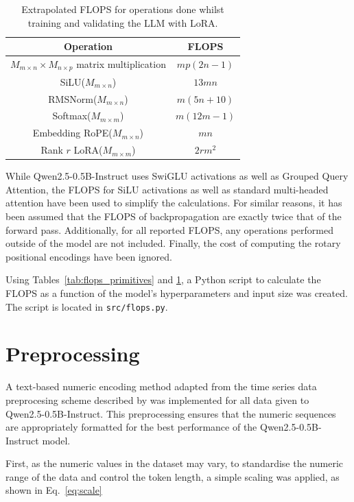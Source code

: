 \documentclass[11pt,a4paper]{article}
\begin{document}
\begin{table}
    \centering
    \begin{tabular}{c|c}
        Operation & FLOPS \\
        \hline
        $M_{m \times n} \times M_{n \times p}$ matrix multiplication & $mp(2n-1)$\\
        SiLU($M_{m \times n}$)& $13mn$ \\
        RMSNorm($M_{m \times n}$) & $m(5n + 10)$ \\
        Softmax($M_{m \times m}$) & $m(12m-1)$\\
        Embedding RoPE($M_{m \times n}$) & $mn$ \\ 
        Rank $r$ LoRA($M_{m \times m}$) & $2rm^2$
    \end{tabular}
    \caption{Extrapolated FLOPS for operations done whilst training and validating the LLM with LoRA.}
    \label{tab:flops_advanced}
\end{table}
While Qwen2.5-0.5B-Instruct uses SwiGLU activations as well as Grouped Query Attention, the FLOPS for SiLU activations as well as standard multi-headed attention have been used to simplify the calculations. For similar reasons, it has been assumed that the FLOPS of backpropagation are exactly twice that of the forward pass. Additionally, for all reported FLOPS, any operations performed outside of the model are not included. Finally, the cost of computing the rotary positional encodings have been ignored.

Using Tables~\ref{tab:flops_primitives} and \ref{tab:flops_advanced}, a Python script to calculate the FLOPS as a function of the model's hyperparameters and input size was created. The script is located in \texttt{src/flops.py}.

\section{Preprocessing}
\label{zero}
A text-based numeric encoding method adapted from the time series data preprocesing scheme described by \citeauthor{gruver2024largelanguagemodelszeroshot} was implemented for all data given to Qwen2.5-0.5B-Instruct. This preprocessing ensures that the numeric sequences are appropriately formatted for the best performance of the Qwen2.5-0.5B-Instruct model.

First, as the numeric values in the dataset may vary, to standardise the numeric range of the data and control the token length, a simple scaling was applied, as shown in Eq.~\ref{eq:scale}
\end{document}
